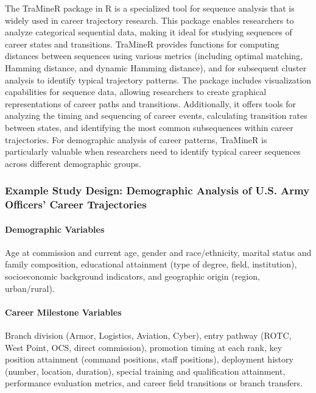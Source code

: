 \documentclass[../main.tex]{subfiles}
\begin{document}
 The TraMineR package in R is a specialized tool for sequence analysis that is widely used in career trajectory research. This package enables researchers to analyze categorical sequential data, making it ideal for studying sequences of career states and transitions. TraMineR provides functions for computing distances between sequences using various metrics (including optimal matching, Hamming distance, and dynamic Hamming distance), and for subsequent cluster analysis to identify typical trajectory patterns. The package includes visualization capabilities for sequence data, allowing researchers to create graphical representations of career paths and transitions. Additionally, it offers tools for analyzing the timing and sequencing of career events, calculating transition rates between states, and identifying the most common subsequences within career trajectories. For demographic analysis of career patterns, TraMineR is particularly valuable when researchers need to identify typical career sequences across different demographic groups.

\subsubsection{Example Study Design: Demographic Analysis of U.S. Army Officers' Career Trajectories}


\paragraph{Demographic Variables} Age at commission and current age, gender and race/ethnicity, marital status and family composition, educational attainment (type of degree, field, institution), socioeconomic background indicators, and geographic origin (region, urban/rural).

\paragraph{Career Milestone Variables} Branch division (Armor, Logistics, Aviation, Cyber), entry pathway (ROTC, West Point, OCS, direct commission), promotion timing at each rank, key position attainment (command positions, staff positions), deployment history (number, location, duration), special training and qualification attainment, performance evaluation metrics, and career field transitions or branch transfers.
\end{document}
